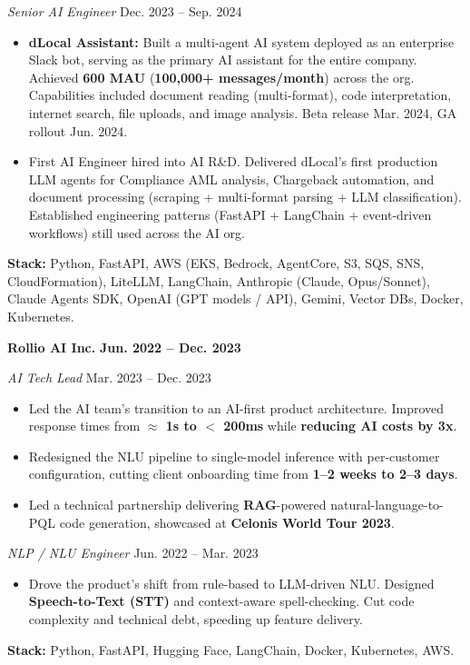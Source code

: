 \documentclass[letterpaper,11pt]{article}
\newcommand{\resumeItem}[1]{
  \item{\small
    {#1 \vspace{-1pt}}
  }
}
\newcommand{\resumeItemListStart}{\begin{itemize}}
\newcommand{\resumeItemListEnd}{\end{itemize}\vspace{0pt}}
\begin{document}
    \vspace{2pt}
    \textit{Senior AI Engineer} \hfill \small Dec. 2023 -- Sep. 2024
    \resumeItemListStart
        \resumeItem{\textbf{dLocal Assistant:} Built a multi-agent AI system deployed as an enterprise Slack bot, serving as the primary AI assistant for the entire company. Achieved \textbf{600 MAU} (\textbf{100,000+ messages/month}) across the org. Capabilities included document reading (multi-format), code interpretation, internet search, file uploads, and image analysis. Beta release Mar. 2024, GA rollout Jun. 2024.}
        \resumeItem{First AI Engineer hired into AI R\&D. Delivered dLocal's first production LLM agents for Compliance AML analysis, Chargeback automation, and document processing (scraping + multi-format parsing + LLM classification). Established engineering patterns (FastAPI + LangChain + event-driven workflows) still used across the AI org.}
    \resumeItemListEnd
    {\small \textbf{Stack:} Python, FastAPI, AWS (EKS, Bedrock, AgentCore, S3, SQS, SNS, CloudFormation), LiteLLM, LangChain, Anthropic (Claude, Opus/Sonnet), Claude Agents SDK, OpenAI (GPT models / API), Gemini, Vector DBs, Docker, Kubernetes.}

    \vspace{10pt}
    \item
    \textbf{\Large Rollio AI Inc.} \hfill \textbf{Jun. 2022 -- Dec. 2023}

    \vspace{2pt}
    \textit{AI Tech Lead} \hfill \small Mar. 2023 -- Dec. 2023
    \resumeItemListStart
        \resumeItem{Led the AI team's transition to an AI-first product architecture. Improved response times from \textbf{$\approx$ 1s to $<$ 200ms} while \textbf{reducing AI costs by 3x}.}
        \resumeItem{Redesigned the NLU pipeline to single-model inference with per-customer configuration, cutting client onboarding time from \textbf{1–2 weeks to 2–3 days}.}
        \resumeItem{Led a technical partnership delivering \textbf{RAG}-powered natural-language-to-PQL code generation, showcased at \textbf{Celonis World Tour 2023}.}
    \resumeItemListEnd

    \vspace{2pt}
    \textit{NLP / NLU Engineer} \hfill \small Jun. 2022 -- Mar. 2023
    \resumeItemListStart
        \resumeItem{Drove the product's shift from rule-based to LLM-driven NLU. Designed \textbf{Speech-to-Text (STT)} and context-aware spell-checking. Cut code complexity and technical debt, speeding up feature delivery.}
    \resumeItemListEnd
    {\small \textbf{Stack:} Python, FastAPI, Hugging Face, LangChain, Docker, Kubernetes, AWS.}
\end{document}
